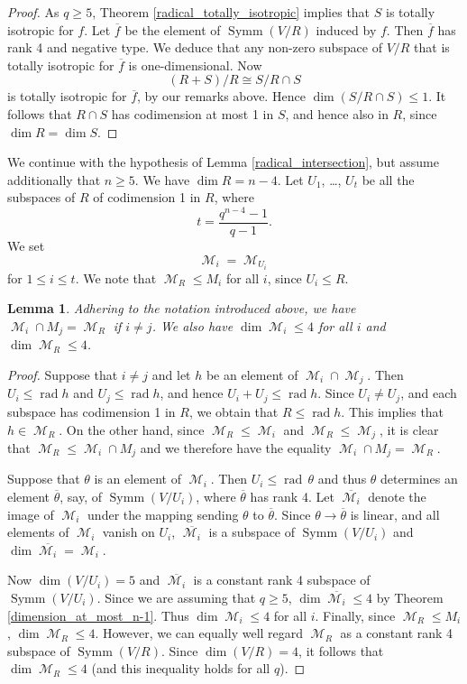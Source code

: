 \documentclass{amsart}
\DeclareMathOperator{\M}{\mathcal{M}}
\DeclareMathOperator{\rad}{rad}
\DeclareMathOperator{\Symm}{Symm}
\theoremstyle{plain}
\newtheorem{lemma}{Lemma}
\theoremstyle{definition}
\begin{document}
\begin{proof}
 
As $q\geq 5$, Theorem \ref{radical_totally_isotropic} implies that $S$ is totally isotropic for $f$. Let $\overline{f}$ be the element of
$\Symm(V/R)$ induced by $f$. Then $\overline{f}$ has rank 4 and negative type. We deduce that any non-zero subspace of $V/R$ that is totally isotropic for
$\overline{f}$ is one-dimensional. Now
\[
 (R+S)/R\cong S/R\cap S
\]
is totally isotropic for $\overline{f}$, by our remarks above. Hence $\dim (S/R\cap S)\leq 1$. It follows that $R\cap S$ has codimension at most 1 in $S$, and hence also in $R$, since $\dim R=\dim S$.
\end{proof}

We continue with the hypothesis of Lemma \ref{radical_intersection}, but assume additionally that $n\geq 5$. We have $\dim R=n-4$. Let $U_1$,
\dots, $U_t$ be all the subspaces of $R$ of codimension 1 in $R$, where
\[
 t=\frac{q^{n-4}-1}{q-1}.
\]
We set
\[
 \M_i=\M_{U_i}
\]
for $1\leq i\leq t$. We note that $\M_R\leq M_i$ for all $i$, since $U_i\leq R$. 

\begin{lemma} \label{M_i_intersections}
Adhering to the notation introduced above, we have $\M_i\cap M_j=\M_R$ if $i\neq j$. We also have $\dim \M_i\leq 4$ for all $i$ and
$\dim \M_R\leq 4$. 

\end{lemma}

\begin{proof}
 
Suppose that $i\neq j$ and let $h$ be an element of $\M_i\cap \M_j$. Then $U_i\leq \rad h$ and $U_j\leq \rad h$, and hence $U_i+U_j\leq \rad h$.
Since $U_i\neq U_j$, and each subspace has codimension 1 in $R$, we obtain that $R\leq \rad h$. This implies that $h\in \M_R$. On the other hand,
since $\M_R\leq \M_i$ and $\M_R\leq \M_j$, it is clear that $\M_R\leq \M_i\cap M_j$ and we therefore have the equality  $\M_i\cap M_j=\M_R$.

Suppose that $\theta$ is an element of $\M_i$. Then $U_i\leq \rad \,\theta$ and thus $\theta$ determines an element $\overline{\theta}$, say,
of $\Symm(V/U_i)$, where $\overline{\theta}$ has rank 4. Let $\overline{\M_i}$ denote the image of $\M_i$ under the mapping sending
$\theta$ to $\overline{\theta}$. Since $\theta\to \overline{\theta}$ is linear, and all elements of $\M_i$ vanish on $U_i$, $\overline{\M_i}$ is a subspace of $\Symm(V/U_i)$ and $\dim \overline{\M_i}=\M_i$. 

Now $\dim (V/U_i)=5$ and $\overline{\M_i}$ is a constant rank 4 subspace of $\Symm(V/U_i)$. Since we are assuming that $q\geq 5$, $\dim \overline{\M_i}\leq 4$ by Theorem \ref{dimension_at_most_n-1}. Thus $\dim \M_i\leq 4$ for all $i$. Finally, since $\M_R\leq M_i$, $\dim \M_R\leq 4$. However, we can equally well regard $\M_R$ as a constant rank 4 subspace of $\Symm(V/R)$. Since $\dim (V/R)=4$, it follows that
$\dim \M_R\leq 4$ (and this inequality holds for all $q$).


\end{proof}
\end{document}
